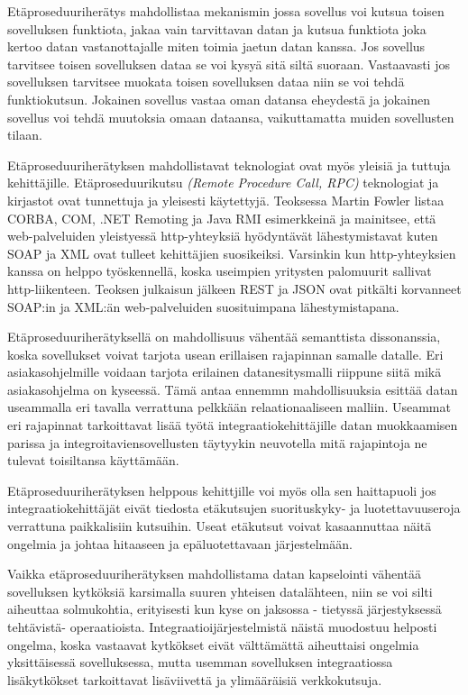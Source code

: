 Etäproseduuriherätys mahdollistaa mekanismin jossa sovellus voi kutsua toisen sovelluksen funktiota, jakaa vain tarvittavan datan ja kutsua funktiota joka kertoo datan vastanottajalle miten toimia jaetun datan kanssa.
Jos sovellus tarvitsee toisen sovelluksen dataa se voi kysyä sitä siltä suoraan. Vastaavasti jos sovelluksen tarvitsee muokata toisen sovelluksen dataa niin se voi tehdä funktiokutsun.
Jokainen sovellus vastaa oman datansa eheydestä ja jokainen sovellus voi tehdä muutoksia omaan dataansa, vaikuttamatta muiden sovellusten tilaan.

Etäproseduuriherätyksen mahdollistavat teknologiat ovat myös yleisiä ja tuttuja kehittäjille. Etäproseduurikutsu \textit{(Remote Procedure Call, RPC)} teknologiat ja kirjastot ovat tunnettuja ja yleisesti käytettyjä. Teoksessa \citep[sivu~71]{Hohpe2004} Martin Fowler listaa CORBA, COM, .NET Remoting ja Java RMI esimerkkeinä ja mainitsee, että web-palveluiden yleistyessä http-yhteyksiä hyödyntävät lähestymistavat kuten SOAP ja XML ovat tulleet kehittäjien suosikeiksi. Varsinkin kun http-yhteyksien kanssa on helppo työskennellä, koska useimpien yritysten palomuurit sallivat http-liikenteen. Teoksen julkaisun jälkeen REST ja JSON ovat pitkälti korvanneet SOAP:in ja XML:än web-palveluiden suosituimpana lähestymistapana.

Etäproseduuriherätyksellä on mahdollisuus vähentää  semanttista dissonanssia, koska sovellukset voivat tarjota usean erillaisen rajapinnan samalle datalle. Eri asiakasohjelmille voidaan tarjota erilainen datanesitysmalli riippune siitä mikä asiakasohjelma on kyseessä. Tämä antaa ennemmn mahdollisuuksia esittää datan useammalla eri tavalla verrattuna pelkkään relaationaaliseen malliin.
Useammat eri rajapinnat tarkoittavat lisää työtä integraatiokehittäjille datan muokkaamisen parissa ja integroitaviensovellusten täytyykin neuvotella mitä rajapintoja ne tulevat toisiltansa käyttämään.

Etäproseduuriherätyksen helppous kehittjille voi myös olla sen haittapuoli jos integraatiokehittäjät eivät tiedosta etäkutsujen suorituskyky- ja luotettavuuseroja verrattuna paikkalisiin kutsuihin. Useat etäkutsut voivat kasaannuttaa näitä ongelmia ja johtaa hitaaseen ja epäluotettavaan järjestelmään.

Vaikka etäproseduuriherätyksen mahdollistama datan kapselointi vähentää sovelluksen kytköksiä karsimalla suuren yhteisen datalähteen, niin se voi silti aiheuttaa solmukohtia, erityisesti kun kyse on jaksossa - tietyssä järjestyksessä tehtävistä- operaatioista. Integraatioijärjestelmistä näistä muodostuu helposti ongelma, koska vastaavat kytkökset eivät välttämättä aiheuttaisi ongelmia yksittäisessä sovelluksessa, mutta usemman sovelluksen integraatiossa lisäkytkökset tarkoittavat lisäviivettä ja ylimääräisiä verkkokutsuja.

